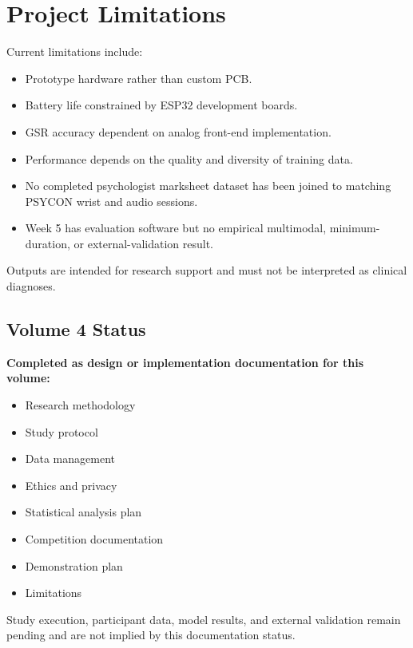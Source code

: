\section{Project Limitations}
\label{sec:project-limitations}

Current limitations include:
\begin{itemize}
    \item Prototype hardware rather than custom PCB.
    \item Battery life constrained by ESP32 development boards.
    \item GSR accuracy dependent on analog front-end implementation.
    \item Performance depends on the quality and diversity of training data.
    \item No completed psychologist marksheet dataset has been joined to matching PSYCON wrist and audio sessions.
    \item Week 5 has evaluation software but no empirical multimodal, minimum-duration, or external-validation result.
\end{itemize}

\begin{warningbox}
Outputs are intended for research support and must not be interpreted as clinical diagnoses.
\end{warningbox}

\subsection{Volume 4 Status}
\label{sec:volume4-status}

\begin{validationbox}
\textbf{Completed as design or implementation documentation for this volume:}
\begin{itemize}
    \item Research methodology
    \item Study protocol
    \item Data management
    \item Ethics and privacy
    \item Statistical analysis plan
    \item Competition documentation
    \item Demonstration plan
    \item Limitations
\end{itemize}
Study execution, participant data, model results, and external validation remain pending and are not implied by this documentation status.
\end{validationbox}
